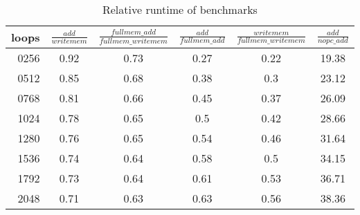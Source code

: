 \begin{table}
    \centering
    \begin{tabular}{r|cc|cc|c}
        loops & $\frac{add}{writemem}$ & $\frac{fullmem\_add}{fullmem\_writemem}$ & $\frac{add}{fullmem\_add}$ & $\frac{writemem}{fullmem\_writemem}$ & $\frac{add}{nopc\_add}$ \\
        \hline
        0256  & 0.92                   & 0.73                                     & 0.27                       & 0.22                                 & 19.38                   \\
        0512  & 0.85                   & 0.68                                     & 0.38                       & 0.3                                  & 23.12                   \\
        0768  & 0.81                   & 0.66                                     & 0.45                       & 0.37                                 & 26.09                   \\
        1024  & 0.78                   & 0.65                                     & 0.5                        & 0.42                                 & 28.66                   \\
        1280  & 0.76                   & 0.65                                     & 0.54                       & 0.46                                 & 31.64                   \\
        1536  & 0.74                   & 0.64                                     & 0.58                       & 0.5                                  & 34.15                   \\
        1792  & 0.73                   & 0.64                                     & 0.61                       & 0.53                                 & 36.71                   \\
        2048  & 0.71                   & 0.63                                     & 0.63                       & 0.56                                 & 38.36                   \\
    \end{tabular}
    \caption{Relative runtime of benchmarks}\label{tab:time_rel}
\end{table}
